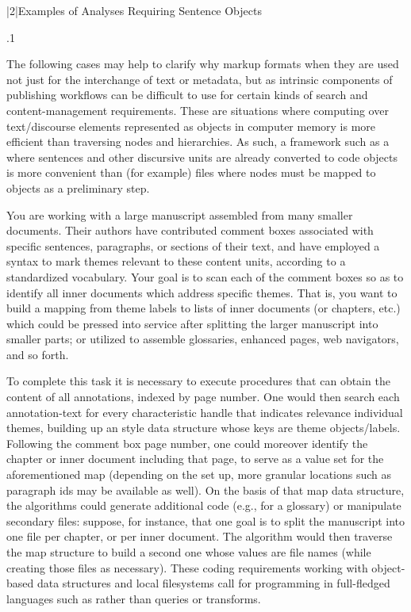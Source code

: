 \documentclass[11pt, twocolumn]{article}
\begin{document}
\s|2|{Examples of Analyses Requiring Sentence Objects}

\p.1{%
The following cases may help to clarify why markup formats
\mdash{} when they are used not just for the interchange of text or metadata, but
as intrinsic components of publishing workflows \mdash{} can be
difficult to use for certain kinds of search and content-management
requirements. These are situations where computing
over text/discourse elements represented as objects in computer
memory is more efficient than traversing  nodes
and hierarchies. As such, a framework such as a
 \mdash{}
where sentences and other discursive units are already
converted to code objects \mdash{} is more convenient
than (for example)  files where nodes must be
mapped to objects as a preliminary step.

\begin{docDescription}


\hback{5pt} You are working with a
large manuscript assembled from many smaller documents. Their authors
have contributed  comment boxes associated with specific sentences,
paragraphs, or sections of their text, and have employed a 
syntax to mark themes relevant to these content units, according to a
standardized vocabulary. Your goal is to scan each of the comment boxes
so as to identify all inner documents which address specific themes.
That is, you want to build a mapping from theme labels
to lists of inner documents (or chapters, etc.) which could be
pressed into service after splitting the larger manuscript into smaller parts;
or utilized to assemble glossaries, enhanced  pages,
web navigators, and so forth.

\pseudoIndent{} To complete this task it is necessary to execute procedures that
can obtain the content of all  annotations, indexed by
page number. One would then search each annotation-text for
every characteristic handle that indicates relevance \visavis{} individual themes, building
up an  style data structure whose keys
are theme objects/labels. Following the comment box page number,
one could moreover identify the chapter or inner document including
that page, to serve as a value set for the aforementioned map (depending
on the set up, more granular locations such as paragraph ids
may be available as well). On the basis of that map data structure,
the algorithms could generate additional code (e.g., for a glossary)
or manipulate secondary files: suppose, for instance,
that one goal is to split the manuscript into one file
per chapter, or per inner document. The algorithm would
then traverse the map structure to build a second one
whose values are file names (while creating those files
as necessary). These coding requirements \mdash{} working with
object-based data structures and local filesystems \mdash{} call
for programming in full-fledged languages such as  rather
than queries or  transforms.


\end{docDescription}}
\end{document}
